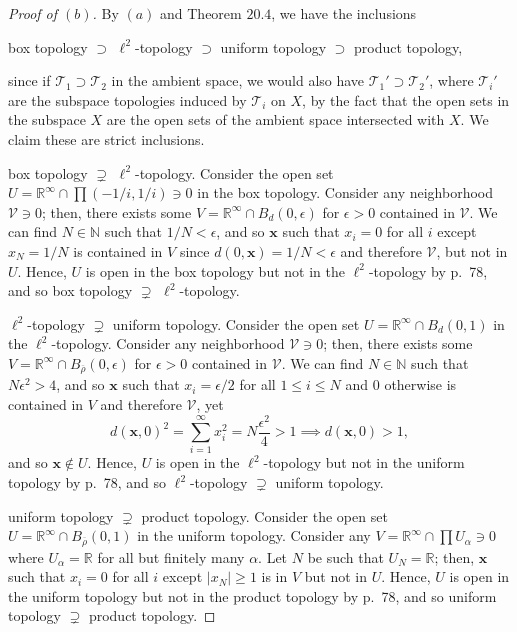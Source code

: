 \documentclass[12pt]{article}
\theoremstyle{remark}
\begin{document}
\begin{proof}[Proof of $(b)$]
  By $(a)$ and Theorem $20.4$, we have the inclusions
  \begin{center}
    box topology $\supset$ $\ell^2$-topology $\supset$ uniform topology $\supset$ product topology,
  \end{center}
  since if $\mathcal{T}_1 \supset \mathcal{T}_2$ in the ambient space, we would also have $\mathcal{T}_1' \supset \mathcal{T}_2'$, where $\mathcal{T}_i'$ are the subspace topologies induced by $\mathcal{T}_i$ on $X$, by the fact that the open sets in the subspace $X$ are the open sets of the ambient space intersected with $X$. We claim these are strict inclusions.
  \par box topology $\supsetneq$ $\ell^2$-topology. Consider the open set $U = \mathbb{R}^\infty \cap \prod (-1/i,1/i) \ni 0$ in the box topology. Consider any neighborhood $\mathcal{V} \ni 0$; then, there exists some $V = \mathbb{R}^\infty \cap B_d(0,\epsilon)$ for $\epsilon > 0$ contained in $\mathcal{V}$. We can find $N \in \mathbb{N}$ such that $1/N < \epsilon$, and so $\mathbf{x}$ such that $x_i = 0$ for all $i$ except $x_N = 1/N$ is contained in $V$ since $d(0,\mathbf{x}) = 1/N < \epsilon$ and therefore $\mathcal{V}$, but not in $U$. Hence, $U$ is open in the box topology but not in the $\ell^2$-topology by p.~78, and so box topology $\supsetneq$ $\ell^2$-topology.
  \par $\ell^2$-topology $\supsetneq$ uniform topology. Consider the open set $U = \mathbb{R}^\infty \cap B_d(0,1)$ in the $\ell^2$-topology. Consider any neighborhood $\mathcal{V} \ni 0$; then, there exists some $V = \mathbb{R}^\infty \cap B_{\overline{\rho}}(0,\epsilon)$ for $\epsilon > 0$ contained in $\mathcal{V}$. We can find $N \in \mathbb{N}$ such that $N\epsilon^2 > 4$, and so $\mathbf{x}$ such that $x_i = \epsilon/2$ for all $1 \le i \le N$ and $0$ otherwise is contained in $V$ and therefore $\mathcal{V}$, yet
  \begin{equation*}
    d(\mathbf{x},0)^2 = \sum_{i=1}^\infty x_i^2 = N\frac{\epsilon^2}{4} > 1 \implies d(\mathbf{x},0) > 1,
  \end{equation*}
  and so $\mathbf{x} \notin U$. Hence, $U$ is open in the $\ell^2$-topology but not in the uniform topology by p.~78, and so $\ell^2$-topology $\supsetneq$ uniform topology.
  \par uniform topology $\supsetneq$ product topology. Consider the open set $U = \mathbb{R}^\infty \cap B_{\overline{\rho}}(0,1)$ in the uniform topology. Consider any $V = \mathbb{R}^\infty \cap \prod U_\alpha \ni 0$ where $U_\alpha = \mathbb{R}$ for all but finitely many $\alpha$. Let $N$ be such that $U_N = \mathbb{R}$; then, $\mathbf{x}$ such that $x_i = 0$ for all $i$ except $|x_N| \ge 1$ is in $V$ but not in $U$. Hence, $U$ is open in the uniform topology but not in the product topology by p.~78, and so uniform topology $\supsetneq$ product topology.
\end{proof}
\end{document}
